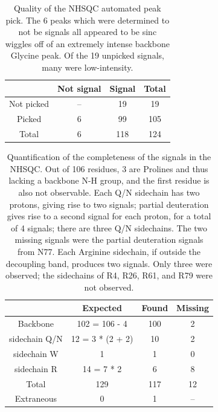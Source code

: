 \begin{table}
    \begin{tabular}{ | c || c | c || c| }
      \hline
                    &  Not signal   &  Signal   &  Total    \\  \hline \hline
      Not picked    &  --           &  19       &  19       \\  \hline
      Picked        &  6            &  99       &  105      \\  \hline \hline
      Total         &  6            &  118      &  124      \\  \hline
    \end{tabular}
    \caption[Quality of the NHSQC automated peak pick.]
            {Quality of the NHSQC automated peak pick.  The 6 peaks which
             were determined to not be signals all appeared to be sinc wiggles
             off of an extremely intense backbone Glycine peak.  Of the 19 
             unpicked signals, many were low-intensity.}
    \label{nhsqc_peakpick}
\end{table}

\begin{table}
    \begin{tabular}{ | c || c | c || c | }
        \hline
                        &  Expected         &  Found    &  Missing  \\  \hline \hline
        Backbone        &  102 = 106 - 4    &  100      &  2        \\  \hline
        sidechain Q/N   &  12 = 3 * (2 + 2) &  10       &  2        \\  \hline
        sidechain W     &  1                &  1        &  0        \\  \hline
        sidechain R     &  14 = 7 * 2       &  6        &  8        \\  \hline \hline
        Total           &  129              &  117      &  12       \\  \hline \hline
        Extraneous      &  0                &  1        &  --       \\  \hline
    \end{tabular}
    \caption[Quantification of the completeness of the signals in the NHSQC.]
            {Quantification of the completeness of the signals in the NHSQC.
             Out of 106 residues, 3 are Prolines and thus lacking a backbone
             N-H group, and the first residue is also not observable.
             Each Q/N sidechain has two protons, giving rise to two signals;
             partial deuteration gives rise to a second signal for each proton,
             for a total of 4 signals; there are three Q/N sidechains.  The
             two missing signals were the partial deuteration signals from N77.
             Each Arginine sidechain, if outside the decoupling band,
             produces two signals.  Only three were observed; the sidechains
             of R4, R26, R61, and R79 were not observed.}
    \label{nhsqc_signals}
\end{table}

